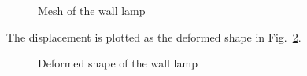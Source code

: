 \begin{figure}[!ht]
\begin{subfigure}[b]{0.48\linewidth}
{        }
    \end{subfigure}
    \begin{subfigure}[b]{0.48\linewidth}
        \centering
    \end{subfigure}
    \caption[Mesh of the wall lamp]{Mesh of the wall lamp}
    \label{oct_ex:lamp_mesh}
\end{figure}
%
The displacement is plotted as the deformed shape in Fig.~\ref{oct_ex:lamp_deformed_shape}.
\begin{figure}[!ht]
    \centering
    \caption[Deformed shape of the wall lamp]{Deformed shape of the wall lamp}
    \label{oct_ex:lamp_deformed_shape}
\end{figure}
